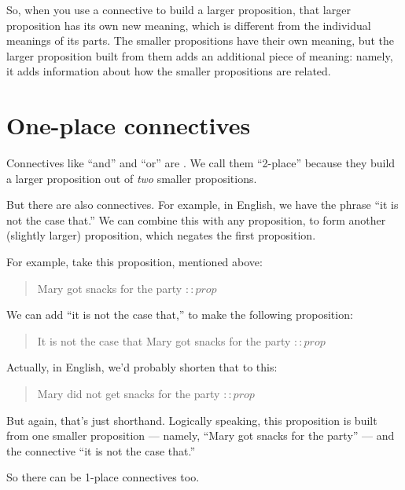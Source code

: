 \documentclass[../../../main.tex]{subfiles}
\begin{document}
So, when you use a connective to build a larger proposition, that larger proposition has its own new meaning, which is different from the individual meanings of its parts. The smaller propositions have their own meaning, but the larger proposition built from them adds an additional piece of meaning: namely, it adds information about how the smaller propositions are related.


\section{One-place connectives}

Connectives like ``and'' and ``or'' are . We call them ``2-place'' because they build a larger proposition out of \emph{two} smaller propositions.

But there are also  connectives. For example, in English, we have the phrase ``it is not the case that.'' We can combine this with any proposition, to form another (slightly larger) proposition, which negates the first proposition.

For example, take this proposition, mentioned above:

\begin{quote}
  Mary got snacks for the party $:: prop$
\end{quote}

\noindent
We can add ``it is not the case that,'' to make the following proposition:

\begin{quote}
  It is not the case that Mary got snacks for the party $:: prop$
\end{quote}

\noindent
Actually, in English, we'd probably shorten that to this:

\begin{quote}
  Mary did not get snacks for the party $:: prop$
\end{quote}

\noindent
But again, that's just shorthand. Logically speaking, this proposition is built from one smaller proposition --- namely, ``Mary got snacks for the party'' --- and the connective ``it is not the case that.''

So there can be 1-place connectives too.



\end{document}
